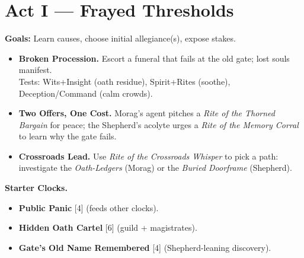 \documentclass[11pt]{article}
\newcommand{\clock}[1]{\textsc{[#1]}}
\begin{document}
\section*{Act I --- Frayed Thresholds}
\textbf{Goals:} Learn causes, choose initial allegiance(s), expose stakes.
\begin{itemize}
  \item \textbf{Broken Procession.} Escort a funeral that fails at the old gate; lost souls manifest.\\
  Tests: Wits+Insight (oath residue), Spirit+Rites (soothe), Deception/Command (calm crowds).
  \item \textbf{Two Offers, One Cost.} Morag's agent pitches a \textit{Rite of the Thorned Bargain} for peace; the Shepherd's acolyte urges a \textit{Rite of the Memory Corral} to learn why the gate fails.
  \item \textbf{Crossroads Lead.} Use \textit{Rite of the Crossroads Whisper} to pick a path: investigate the \emph{Oath-Ledgers} (Morag) or the \emph{Buried Doorframe} (Shepherd).
\end{itemize}
\textbf{Starter Clocks.}
\begin{itemize}
  \item \textbf{Public Panic} \clock{4} (feeds other clocks).
  \item \textbf{Hidden Oath Cartel} \clock{6} (guild + magistrates).
  \item \textbf{Gate's Old Name Remembered} \clock{4} (Shepherd-leaning discovery).
\end{itemize}
\end{document}
